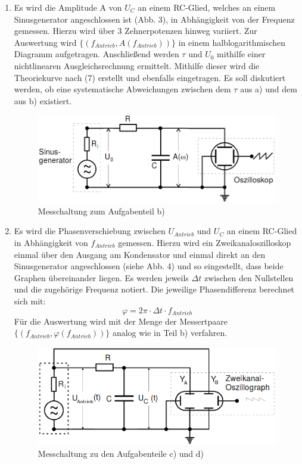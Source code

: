 \begin{enumerate}
  \item Es wird die Amplitude A von $U_C$ an einem RC-Glied, welches an einem Sinusgenerator
   angeschlossen ist (Abb. 3), in Abhängigkeit von der Frequenz gemessen. Hierzu wird über
   3 Zehnerpotenzen hinweg variiert. Zur Auswertung wird $\{(f_{Antrieb}, A(f_{Antrieb}))\}$
   in einem halblogarithmischen Diagramm aufgetragen. Anschließend werden $\tau$ und $U_0$ mithilfe einer nichtlinearen
    Ausgleichsrechnung ermittelt. Mithilfe dieser wird die Theoriekurve nach (7) erstellt und
    ebenfalls eingetragen. Es soll diskutiert werden, ob eine systematische Abweichungen
    zwischen dem $\tau$ aus a) und dem aus b) existiert.
	\begin{figure}[H]
		\centering
		\includegraphics[width=\linewidth-200pt,height=\textheight-200pt,keepaspectratio]{content/Aufgabeb.png}
		\caption{Messchaltung zum Aufgabenteil b) \cite{V353}}
		\label{fig:Aufbaua}
	\end{figure}


    \item Es wird die Phasenverschiebung zwischen $U_{Antrieb}$ und $U_C$ an einem
    RC-Glied in Abhängigkeit von $f_{Antrieb}$ gemessen. Hierzu wird ein Zweikanaloszilloskop
    einmal über den Ausgang am Kondensator und einmal direkt an den Sinusgenerator angeschlossen (siehe Abb. 4)
     und so eingestellt, dass beide Graphen übereinander liegen. Es werden jeweils
      $\Delta t$ zwischen den Nullstellen und die zugehörige Frequenz notiert. Die jeweilige
       Phasendifferenz berechnet sich mit:
       \begin{equation}
         \varphi = 2 \pi \cdot \Delta t \cdot f_{Antrieb}
       \end{equation}
       Für die Auswertung wird mit der Menge der Messertpaare $\{(f_{Antrieb}, \varphi(f_{Antrieb}))\}$
       analog wie in Teil b) verfahren.
       \begin{figure}[H]
       	\centering
       	\includegraphics[width=\linewidth-200pt,height=\textheight-200pt,keepaspectratio]{content/Aufgabec.png}
       	\caption{Messchaltung zu den Aufgabenteile c) und d) \cite{V353}}
       	\label{fig:Aufbaua}
       \end{figure}
       

\end{enumerate}

